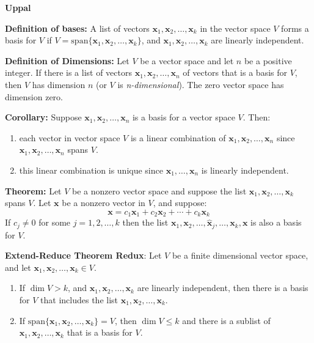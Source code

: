 \documentclass{article}
\newcommand{\bff}[1]{\mathbf{#1}}
\newcommand{\spann}[1]{\mathrm{span}\{#1\}}
\begin{document}
    \begin{minipage}[t]{.45\textwidth} %
        \begin{center}
            \textbf{Uppal}
        \end{center}
        \textbf{Definition of bases:} A list of vectors $\bff{x}_1,\bff{x}_2,\dots,\bff{x}_k$ in the vector space $V$ forms a basis for $V$ if $V = \spann{\bff{x}_1,\bff{x}_2,\dots,\bff{x}_k}$, and $\bff{x}_1,\bff{x}_2,\dots,\bff{x}_k$ are linearly independent.
        \vspace{12.5mm}

        \textbf{Definition of Dimensions:} Let $V$ be a vector space and let $n$ be a positive integer. If there is a list of vectors $\bff{x}_1,\bff{x}_2,\dots,\bff{x}_n$ of vectors that is a basis for $V$, then $V$ has dimension $n$ (or $V$ is \textit{n-dimensional}). The zero vector space has dimension zero.
        \vspace{2mm}

        \textbf{Corollary:} Suppose $\bff{x}_1,\bff{x}_2,\dots,\bff{x}_n$ is a basis for a vector space $V$. Then:
        \begin{enumerate}
            \item each vector in  vector space $V$ is a linear combination of $\bff{x}_1,\bff{x}_2,\dots,\bff{x}_n$ since $\bff{x}_1,\bff{x}_2,\dots,\bff{x}_n$ spans $V$.
            \item this linear combination is unique since $\bff{x}_1,\dots,\bff{x}_n$ is linearly independent.
        \end{enumerate}
        \vspace{2mm}

        \textbf{Theorem:} Let $V$ be a nonzero vector space and suppose the list $\bff{x}_1,\bff{x}_2,\dots,\bff{x}_k$ spans $V$. Let $\bff{x}$ be a nonzero vector in $V$, and suppose:
        \begin{equation*}
            \bff{x} = c_1\bff{x}_1+c_2\bff{x}_2+\cdots+c_k\bff{x}_k
        \end{equation*}
        If $c_j \neq 0$ for some $j=1,2,\dots, k$ then the list $\bff{x}_1,\bff{x}_2,\dots,\hat{\bff{x}}_j,\dots,\bff{x}_k,\bff{x}$ is also a basis for $V$.
        \vspace{2mm}

        \textbf{Extend-Reduce Theorem Redux}: Let $V$ be a finite dimensional vector space, and let $\bff{x}_1,\bff{x}_2,\dots,\bff{x}_k \in V$.
        \begin{enumerate}[label=(\alph*)]
            \item If $\dim V > k$, and $\bff{x}_1,\bff{x}_2, \dots , \bff{x}_k$ are linearly independent, then there is a basis for $V$ that includes the list $\bff{x}_1, \bff{x}_2, \dots, \bff{x}_k.$
            \item If $\spann{\bff{x}_1,\bff{x}_2,\dots,\bff{x}_k} = V$, then $\dim V \le k$ and there is a sublist of $\bff{x}_1,\bff{x}_2,\dots,\bff{x}_k$ that is a basis for $V$.
        \end{enumerate}
        \vspace{2mm}


\end{minipage}
\end{document}
